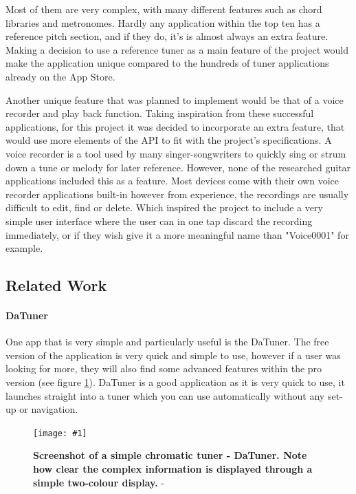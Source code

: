 \documentclass[conference]{acmsiggraph}
\newcommand{\figuremacroW}[4]{
	\begin{figure}[H] %
		\centering
		\texttt{[image: \#1]}
		\caption[#2]{\textbf{#2} - #3}
		\label{fig:#1}
	\end{figure}
}
\begin{document}
Most of them are very complex, with many different features such as chord libraries and metronomes. Hardly any application within the top ten has a reference pitch section, and if they do, it's is almost always an extra feature. Making a decision to use a reference tuner as a main feature of the project would make the application unique compared to the hundreds of tuner applications already on the App Store.

Another unique feature that was planned to implement would be that of a voice recorder and play back function. Taking inspiration from these successful applications, for this project it was decided to incorporate an extra feature, that would use more elements of the API to fit with the project's specifications. A voice recorder is a tool used by many singer-songwriters to quickly sing or strum down a tune or melody for later reference. However, none of the researched guitar applications included this as a feature. Most devices come with their own voice recorder applications built-in however from experience, the recordings are usually difficult to edit, find or delete. Which inspired the project to include a very simple user interface where the user can in one tap discard the recording immediately, or if they wish give it a more meaningful name than "Voice0001" for example.  

\subsection{Related Work}

\paragraph{DaTuner} One app that is very simple and particularly useful is the DaTuner. The free version of the application is very quick and simple to use, however if a user was looking for more, they will also find some advanced features within the pro version (see figure \ref{fig:daTune}). DaTuner is a good application as it is very quick to use, it launches straight into a tuner which you can use automatically without any set-up or navigation.

\figuremacroW
{daTune}
{Screenshot of a simple chromatic tuner - DaTuner. Note how clear the complex information is displayed through a simple two-colour display.}
{\protect\cite{DaTune}}
{1.0}
\end{document}
